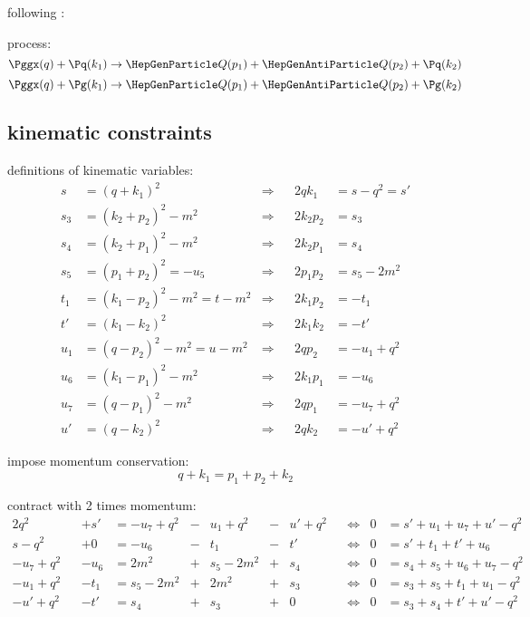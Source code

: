 following \cite{PhysRevD.40.54,van_neerven_dimensional_1986,Marco}:

process:
\begin{equation} \Pggx(q) + \Pq(k_1) \rightarrow \PQ(p_1)+\PaQ(p_2) + \Pq(k_2) \end{equation}
\begin{equation} \Pggx(q) + \Pg(k_1) \rightarrow \PQ(p_1)+\PaQ(p_2) + \Pg(k_2) \end{equation}

\subsection{kinematic constraints}

definitions of kinematic variables:
\begin{align}
s &= (q+k_1)^2 &\Rightarrow& &2qk_1 &= s-q^2 = s'\\
s_3 &= (k_2+p_2)^2-m^2  &\Rightarrow& &2k_2p_2 &= s_3\\
s_4 &= (k_2+p_1)^2-m^2  &\Rightarrow& &2k_2p_1 &= s_4\\
s_5 &= (p_1+p_2)^2 = -u_5  &\Rightarrow& &2p_1p_2 &= s_5-2m^2\\
t_1 &= (k_1-p_2)^2-m^2 = t - m^2  &\Rightarrow& &2k_1p_2 &=-t_1\\
t' &= (k_1-k_2)^2  &\Rightarrow& &2k_1k_2 &= -t'\\
u_1 &= (q-p_2)^2-m^2 = u - m^2  &\Rightarrow& &2qp_2 &=-u_1+q^2\\
u_6 &= (k_1-p_1)^2 - m^2  &\Rightarrow& &2k_1p_1 &=-u_6\\
u_7 &= (q-p_1)^2 - m^2  &\Rightarrow& &2qp_1 &=-u_7+q^2\\
u' &= (q-k_2)^2  &\Rightarrow& &2qk_2 &=-u'+q^2
\end{align}

impose momentum conservation:
\begin{equation}
q+k_1 = p_1+p_2+k_2
\end{equation}

contract with 2 times momentum:
\begin{align}
2q^2 && +s' &=-u_7+q^2 &-& u_1+q^2 &-& u'+q^2 &&\Leftrightarrow &0 &=s'+u_1+u_7+u'-q^2 \label{eq:MomCon3wq} \\
s-q^2 && +0 &= -u_6 &-& t_1 &-& t' &&\Leftrightarrow &0 &= s'+t_1+t'+u_6 \label{eq:MomCon3wk1}\\
-u_7+q^2 && -u_6 &= 2m^2 &+& s_5-2m^2 &+& s_4 &&\Leftrightarrow &0 &= s_4+s_5+u_6+u_7-q^2 \label{eq:MomCon3wp1}\\
-u_1+q^2 && -t_1 &= s_5-2m^2 &+& 2m^2 &+& s_3 &&\Leftrightarrow &0 &= s_3+s_5+t_1+u_1-q^2 \label{eq:MomCon3wp2}\\
-u'+q^2 && -t' &= s_4 &+& s_3 &+& 0 &&\Leftrightarrow &0 &= s_3+s_4+t'+u'-q^2 \label{eq:MomCon3wk2}
\end{align}

